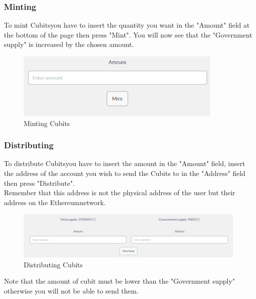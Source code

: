 		\subsubsection{Minting}
		To mint Cubits\glosp you have to insert the quantity you want in the 
		"Amount" field at the bottom of the page then press "Mint". You will 
		now see that the "Government supply" is increased by the chosen amount.
		\begin{figure}[H]
			\includegraphics[width=10cm]{res/images/minting_cubits.png}
			\centering
			\caption{Minting Cubits}
		\end{figure}
		\subsubsection{Distributing}
		To distribute Cubits\glosp you have to insert the amount in the "Amount" 
		field, insert the address of the account you wish to send the Cubits to 
		in the "Address" field then press "Distribute".\\
		Remember that this address is not the physical address of the user but 
		their address on the Ethereum\glosp network.
		\begin{figure}[H]
			\includegraphics[width=15cm]{res/images/distribute_cubit.png}
			\centering
			\caption{Distributing Cubits}
		\end{figure}
		Note that the amount of cubit must be lower than the "Government  
		supply" otherwise you will not be able to send them.
